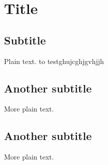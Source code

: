 \documentclass{book}
\begin{document}
\section{Title}

\subsection{Subtitle}

Plain text. to testghujcghjgvhjjh

\subsection{Another subtitle}

More plain text.

\subsection{Another subtitle}

More plain text.
\end{document}
